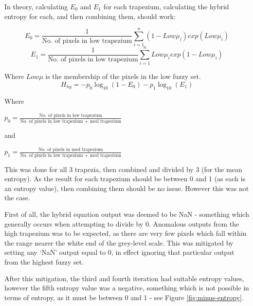 In theory, calculating $E_0$ and $E_1$ for each trapezium, calculating the hybrid entropy for each, and then combining them, should work:

\begin{equation}
E_0 = \frac{1}{\text{No. of pixels in low trapezium}}\displaystyle\sum_{i=1}^{n}{(1-Low\mu_i)exp(Low\mu_i)}
\end{equation}
\begin{equation}
E_1 = \frac{1}{\text{No. of pixels in low trapezium}}\displaystyle\sum_{i=1}^{n}{Low\mu_iexp(1-Low\mu_i)}
\end{equation}

Where $Low\mu$ is the membership of the pixels in the low fuzzy set.
\begin{equation}
H_{hy} = -p_0\log_{10}(1 - E_0) - p_1\log_{10}(E_1)
\end{equation}

Where

$p_0 = \frac{\text{No. of pixels in low trapezium}}{\text{No. of pixels in low trapezium + med trapezium}}$

and

$p_1 = \frac{\text{No. of pixels in med trapezium}}{\text{No. of pixels in low trapezium + med trapezium}}$


This was done for all 3 trapezia, then combined and divided by 3 (for the mean entropy). As the result for each trapezium should be between 0 and 1 (as each is an entropy value), then combining them should be no issue. However this was not the case.

First of all, the hybrid equation output was deemed to be \acrfull{NaN} - something which generally occurs when attempting to divide by 0. Anomalous outputs from the high trapezium was to be expected, as there are very few pixels which fall within the range nearer the white end of the grey-level scale. This was mitigated by setting any `\acrshort{NaN}' output equal to 0, in effect ignoring that particular output from the highest fuzzy set.

After this mitigation, the third and fourth iteration had suitable entropy values, however the fifth entropy value was a negative, something which is not possible in terms of entropy, as it must be between 0 and 1 - see Figure \ref{fig:minus-entropy}.

